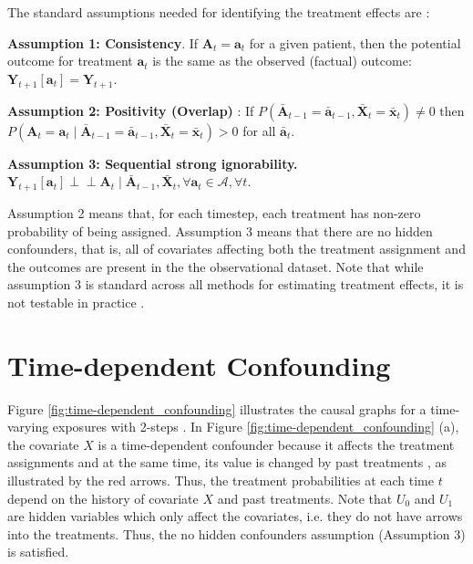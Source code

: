 \documentclass{article} %
\newcommand{\vc}[1]{\mathbf{#1}}
\newcommand{\ci}{\perp\!\!\!\perp}
\newcommand{\cl}[1]{\mathcal{#1}}
\newcommand{\hist}[1]{\bar{\vc{#1}}}
\begin{document}
	The standard assumptions needed for identifying the treatment effects are \citep{robins2008estimation, lim2018forecasting, schulam2017reliable}: 

	\textbf{Assumption 1: Consistency}.  If $\vc{A}_t = \vc{a}_t$ for a given patient, then the potential outcome for treatment $\vc{a}_t$ is the same as the observed (factual) outcome: $\vc{Y}_{t+1}[\vc{a}_t] = \vc{Y}_{t+1}$. 
		
	\textbf{Assumption 2: Positivity (Overlap)} \citep{imai2004causal}: 
		If $P( \hist{A}_{t-1} = \hist{a}_{t-1}, \hist{X}_t = \hist{x}_t)\neq 0$ then $P(\mathbf{A}_t = \mathbf{a}_t \mid \hist{A}_{t-1} = \hist{a}_{t-1}, \hist{X}_t = \hist{x}_t) > 0$ for all $\hist{a}_t$. 
		
	\textbf{Assumption 3: Sequential strong ignorability.} $\vc{Y}_{t+1}[\vc{a}_t]  \ci \vc{A}_t \mid \hist{A}_{t-1},  \hist{X}_{t}, \forall \vc{a}_t \in \cl{A}, \forall t.$ 
		
	Assumption 2 means that, for each timestep, each treatment has non-zero probability of being assigned. Assumption 3 means that there are no hidden confounders, that is, all of covariates affecting both the treatment assignment and the outcomes are present in the the observational dataset. Note that while assumption 3 is standard across all methods for estimating treatment effects, it is not testable in practice \citep{robins2000marginal,  pearl2009causal}.
	
	\clearpage
	
	\section{Time-dependent Confounding} \label{apx:time_dependent_confounding}
	

	Figure \ref{fig:time-dependent_confounding} illustrates the causal graphs for a time-varying exposures with 2-steps \citep{robins2000marginal}. In Figure \ref{fig:time-dependent_confounding} (a), the covariate $X$ is a time-dependent confounder because it affects the treatment assignments and at the same time, its value is changed by past treatments \citep{mansournia2017handling}, as illustrated by the red arrows. Thus, the treatment probabilities at each time $t$ depend on the history of covariate $X$ and past treatments. Note that $U_0$ and $U_1$ are hidden variables which only affect the covariates, i.e. they do not have arrows into the treatments. Thus, the no hidden confounders assumption (Assumption 3) is satisfied.  
	
\end{document}
